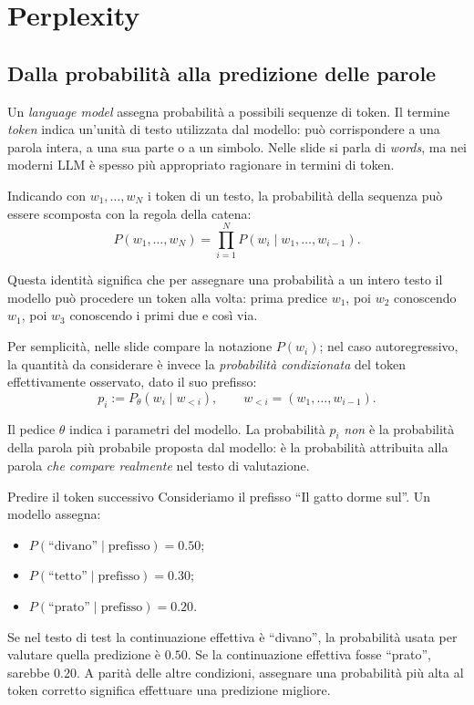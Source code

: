 \newpage

\section{Perplexity}

\subsection{Dalla probabilità alla predizione delle parole}

Un \emph{language model} assegna probabilità a possibili sequenze di token. Il termine \emph{token} indica un'unità di testo utilizzata dal modello: può corrispondere a una parola intera, a una sua parte o a un simbolo. Nelle slide si parla di \emph{words}, ma nei moderni LLM è spesso più appropriato ragionare in termini di token.

Indicando con $w_1,\ldots,w_N$ i token di un testo, la probabilità della sequenza può essere scomposta con la regola della catena:
\begin{equation}
P(w_1,\ldots,w_N)=\prod_{i=1}^{N} P(w_i\mid w_1,\ldots,w_{i-1}).
\end{equation}

Questa identità significa che per assegnare una probabilità a un intero testo il modello può procedere un token alla volta: prima predice $w_1$, poi $w_2$ conoscendo $w_1$, poi $w_3$ conoscendo i primi due e così via.

Per semplicità, nelle slide compare la notazione $P(w_i)$; nel caso autoregressivo, la quantità da considerare è invece la \emph{probabilità condizionata} del token effettivamente osservato, dato il suo prefisso:
\begin{equation}
p_i := P_\theta(w_i\mid w_{<i}), \qquad w_{<i}=(w_1,\ldots,w_{i-1}).
\end{equation}

Il pedice $\theta$ indica i parametri del modello. La probabilità $p_i$ \emph{non} è la probabilità della parola più probabile proposta dal modello: è la probabilità attribuita alla parola \emph{che compare realmente} nel testo di valutazione.

\begin{example}{Predire il token successivo}
Consideriamo il prefisso ``Il gatto dorme sul''. Un modello assegna:
\begin{itemize}
    \item $P(\text{``divano''}\mid\text{prefisso})=0.50$;
    \item $P(\text{``tetto''}\mid\text{prefisso})=0.30$;
    \item $P(\text{``prato''}\mid\text{prefisso})=0.20$.
\end{itemize}
Se nel testo di test la continuazione effettiva è ``divano'', la probabilità usata per valutare quella predizione è $0.50$. Se la continuazione effettiva fosse ``prato'', sarebbe $0.20$. A parità delle altre condizioni, assegnare una probabilità più alta al token corretto significa effettuare una predizione migliore.
\end{example}

